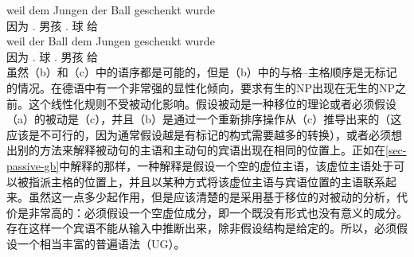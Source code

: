\ex 
\gll weil dem Jungen der Ball geschenkt wurde\\
     因为 .\dat{} 男孩 .\nom{} 球 给 \passivepst\\
\ex 
\gll weil der Ball dem Jungen geschenkt wurde\\
     因为 .\nom{} 球 .\dat{} 男孩 给 \passivepst\\
\zl
虽然（b）和（c）中的语序都是可能的，但是（b）中的与格--主格顺序是无标记的情况。在德语中有一个非常强的显性化倾向，要求有生的NP出现在无生的NP之前\citep[]{Hoberg81a}。这个线性化规则不受被动化影响。假设被动是一种移位的理论或者必须假设（a）的被动是（c），并且（b）是通过一个重新排序操作从（c）推导出来的（这应该是不可行的，因为通常假设越是有标记的构式需要越多的转换），或者必须想出别的方法来解释被动句的主语和主动句的宾语出现在相同的位置上。正如在\ref{sec-passive-gb}中解释的那样，一种解释是假设一个空的虚位主语，该虚位主语处于可以被指派主格的位置上，并且以某种方式将该虚位主语与宾语位置的主语联系起来。虽然这一点多少起作用，但是应该清楚的是采用基于移位的对被动的分析，代价是非常高的：必须假设一个空虚位成分，即一个既没有形式也没有意义的成分。存在这样一个宾语不能从输入中推断出来，除非假设结构是给定的。所以，必须假设一个相当丰富的普遍语法（UG）\indexug。
